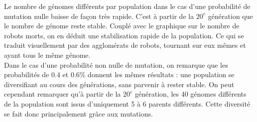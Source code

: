 \documentclass[a4paper]{article}
\begin{document}
Le nombre de génomes différents par population dans le cas d'une probabilité de mutation nulle baisse de façon très rapide. C'est à partir de la $20^{e}$ génération que le nombre de génome reste stable. Couplé avec le graphique sur le nombre de robots morts, on en déduit une stabilisation rapide de la population. Ce qui se traduit visuellement par des agglomérats de robots, tournant sur eux mêmes et ayant tous le même génome.\\
Dans le cas d'une probabilité non nulle de mutation, on remarque que les probabilités de 0.4 et 0.6\% donnent les mêmes résultats : une population se diversifiant au cours des générations, sans parvenir à rester stable. On peut cependant remarquer qu'à partir de la $20^{e}$ génération, les 40 génomes différents de la population sont issus d'uniquement 5 à 6 parents différents. Cette diversité se fait donc principalement grâce aux mutations.
\newpage
\end{document}
